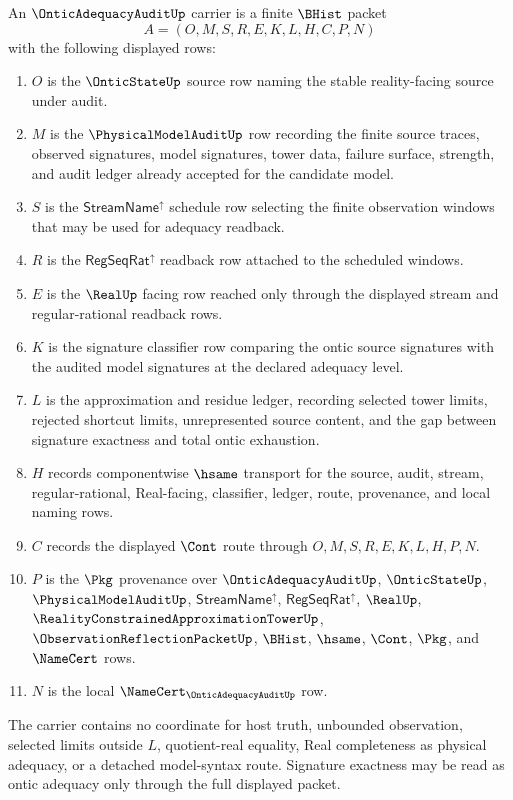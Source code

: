\begin{definition}
\label{def:ontic-adequacy-audit-carrier}
An $\OnticAdequacyAuditUp$ carrier is a finite $\BHist$ packet
$$
A=(O,M,S,R,E,K,L,H,C,P,N)
$$
with the following displayed rows:
\begin{enumerate}
\item $O$ is the $\OnticStateUp$ source row naming the stable reality-facing source under audit.
\item $M$ is the $\PhysicalModelAuditUp$ row recording the finite source traces, observed signatures, model signatures, tower data, failure surface, strength, and audit ledger already accepted for the candidate model.
\item $S$ is the $\mathsf{StreamName}^{\uparrow}$ schedule row selecting the finite observation windows that may be used for adequacy readback.
\item $R$ is the $\mathsf{RegSeqRat}^{\uparrow}$ readback row attached to the scheduled windows.
\item $E$ is the $\RealUp$ facing row reached only through the displayed stream and regular-rational readback rows.
\item $K$ is the signature classifier row comparing the ontic source signatures with the audited model signatures at the declared adequacy level.
\item $L$ is the approximation and residue ledger, recording selected tower limits, rejected shortcut limits, unrepresented source content, and the gap between signature exactness and total ontic exhaustion.
\item $H$ records componentwise $\hsame$ transport for the source, audit, stream, regular-rational, Real-facing, classifier, ledger, route, provenance, and local naming rows.
\item $C$ records the displayed $\Cont$ route through $O,M,S,R,E,K,L,H,P,N$.
\item $P$ is the $\Pkg$ provenance over $\OnticAdequacyAuditUp$, $\OnticStateUp$, $\PhysicalModelAuditUp$, $\mathsf{StreamName}^{\uparrow}$, $\mathsf{RegSeqRat}^{\uparrow}$, $\RealUp$, $\RealityConstrainedApproximationTowerUp$, $\ObservationReflectionPacketUp$, $\BHist$, $\hsame$, $\Cont$, $\Pkg$, and $\NameCert$ rows.
\item $N$ is the local $\NameCert_{\OnticAdequacyAuditUp}$ row.
\end{enumerate}
The carrier contains no coordinate for host truth, unbounded observation, selected limits outside $L$, quotient-real equality, Real completeness as physical adequacy, or a detached model-syntax route. Signature exactness may be read as ontic adequacy only through the full displayed packet.
\end{definition}

